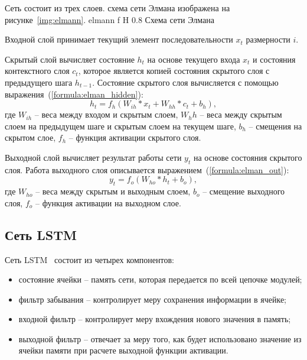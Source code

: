 Сеть состоит из трех слоев. схема сети Элмана изображена на рисунке~\ref{img:elmann}.
{elmann} %
{f} %
{H} %
{0.8\textwidth} %
{Схема сети Элмана} %

Входной слой принимает текущий элемент последовательности $x_t$ размерности $i$.

Скрытый слой вычисляет состояние $h_t$ на основе текущего входа $x_t$ и состояния контекстного слоя $c_t$, которое является копией состояния скрытого слоя с предыдущего шага $h_{t-1}$.
Состояние скрытого слоя вычисляется с помощью выражения~(\ref{formula:elman_hidden}):
\begin{equation}\label{formula:elman_hidden}
	h_t = f_h(W_{ih} * x_t + W_{hh} * c_t + b_h),
\end{equation}
где $W_{ih}$ -- веса между входом и скрытым слоем, $W_hh$ --  веса между скрытым слоем на предыдущем шаге и скрытым слоем на текущем шаге, $b_h$ -- смещения на скрытом слое, $f_h$ -- функция активации скрытого слоя.

Выходной слой вычисляет результат работы сети $y_t$ на основе состояния скрытого слоя.
Работа выходного слоя описывается выражением~(\ref{formula:elman_out}):
\begin{equation}\label{formula:elman_out}
	y_t = f_o(W_{ho} * h_t + b_o),
\end{equation}
где $W_{ho}$ -- веса между скрытым и выходным слоем, $b_o$ -- смещение выходного слоя, $f_o$ -- функция активации на выходном слое.

\subsection{Сеть LSTM}
Сеть LSTM~\cite{yu2019review} состоит из четырех компонентов:
\begin{itemize}
	\item состояние ячейки -- память сети, которая передается по всей цепочке модулей;
	\item фильтр забывания -- контролирует меру сохранения информации в ячейке;
	\item входной фильтр -- контролирует меру вхождения нового значения в память;
	\item выходной фильтр -- отвечает за меру того, как будет использовано значение из ячейки памяти при расчете выходной функции активации.
\end{itemize}

